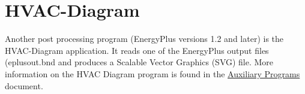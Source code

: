 \section{HVAC-Diagram}\label{hvac-diagram}

Another post processing program (EnergyPlus versions 1.2 and later) is the HVAC-Diagram application. It reads one of the EnergyPlus output files (eplusout.bnd and produces a Scalable Vector Graphics (SVG) file. More information on the HVAC Diagram program is found in the \href{file:///E:/Docs4PDFs/AuxiliaryPrograms.pdf}{Auxiliary Programs} document.
